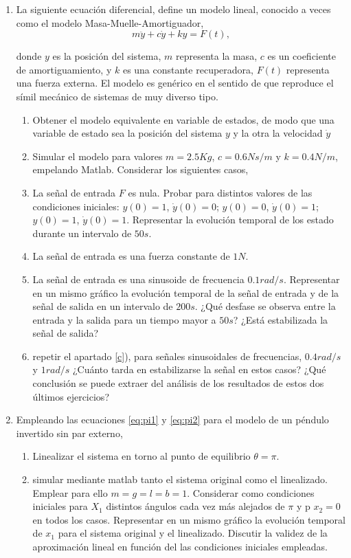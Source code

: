 \begin{enumerate}
\item La siguiente ecuación diferencial, define un modelo lineal, conocido a veces como el modelo Masa-Muelle-Amortiguador,
\begin{equation*}
m\ddot y + c \dot y + k y = F(t),
\end{equation*}

donde $y$ es la posición del sistema, $m$ representa la masa, $c$ es un coeficiente de amortiguamiento, y $k$ es una constante recuperadora, $F(t)$ representa una fuerza externa. El modelo es genérico en el sentido de que reproduce el símil mecánico de sistemas de muy diverso tipo.
\begin{enumerate}
\item Obtener el modelo equivalente en variable de estados, de modo que una variable de estado sea la posición del sistema $y$ y la otra la velocidad $\dot y$
\item Simular el modelo para valores $m=2.5Kg$, $c=0.6Ns/m$ y $k=0.4N/m$, empelando Matlab. Considerar los siguientes casos,
\item La señal de entrada $F$ es nula. Probar para distintos valores de las condiciones iniciales: $y(0) = 1$, $ \dot y(0) =0$; $y(0) = 0$, $\dot y(0) = 1$; $y(0) = 1$, $ \dot y(0) = 1$. Representar la evolución temporal de los estado durante un intervalo de $50s$.
\item La señal de entrada es una fuerza constante de $1N$.
\item \label{c} La señal de entrada  es una sinusoide de frecuencia $0.1 rad/s$. Representar en un mismo gráfico la evolución temporal de la señal de entrada y de la señal de salida en un intervalo de $200s$. ¿Qué desfase se observa entre la entrada y la salida para un tiempo mayor a $50s$? ¿Está estabilizada la señal de salida?
\item \label{d} repetir el apartado \ref{c}), para señales sinusoidales de frecuencias, $0.4 rad/s$ y $1 rad/s$ ¿Cuánto tarda en estabilizarse la señal en estos casos? ¿Qué conclusión se puede extraer del análisis de los resultados de estos dos últimos ejercicios?
\end{enumerate}

\item Empleando las ecuaciones \ref{eq:pi1} y \ref{eq:pi2} para el modelo de un péndulo invertido sin par externo,
\begin{enumerate}
\item Linealizar el sistema en torno al punto de equilibrio $\theta = \pi$.
\item simular mediante matlab tanto el sistema original como el linealizado. Emplear para ello $m = g = l = b = 1$. Considerar como condiciones iniciales para $X_1$ distintos ángulos cada vez más alejados de $\pi$ y p $x_2 = 0$ en todos los casos. Representar en un mismo gráfico la evolución temporal de $x_1$ para el sistema original y el linealizado. Discutir la validez de la aproximación lineal  en función del las condiciones iniciales empleadas.
\end{enumerate}


\end{enumerate}
